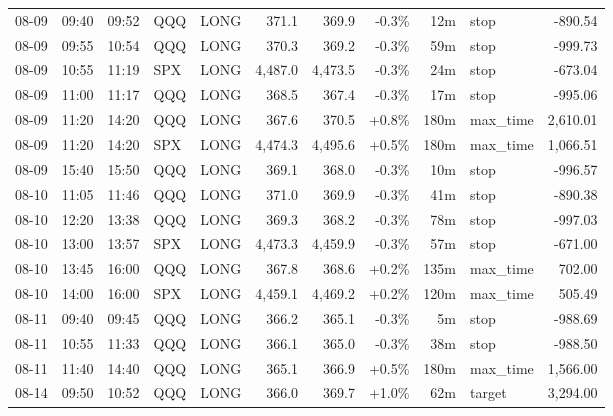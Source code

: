 \documentclass[11pt,a4paper,twoside]{article}
\begin{document}
\begin{center}
\begin{longtable}{>{\color{txtmain}}l l l l l r r r r >{\color{txtmain}}l r}
08-09 & 09:40 & 09:52 & QQQ & LONG & 371.1 & 369.9 & \textcolor{lossred}{-0.3\%} & 12m & stop & \textcolor{lossred}{-890.54} \\
08-09 & 09:55 & 10:54 & QQQ & LONG & 370.3 & 369.2 & \textcolor{lossred}{-0.3\%} & 59m & stop & \textcolor{lossred}{-999.73} \\
08-09 & 10:55 & 11:19 & SPX & LONG & 4,487.0 & 4,473.5 & \textcolor{lossred}{-0.3\%} & 24m & stop & \textcolor{lossred}{-673.04} \\
08-09 & 11:00 & 11:17 & QQQ & LONG & 368.5 & 367.4 & \textcolor{lossred}{-0.3\%} & 17m & stop & \textcolor{lossred}{-995.06} \\
08-09 & 11:20 & 14:20 & QQQ & LONG & 367.6 & 370.5 & \textcolor{wingreen}{+0.8\%} & 180m & max\_time & \textcolor{wingreen}{2,610.01} \\
08-09 & 11:20 & 14:20 & SPX & LONG & 4,474.3 & 4,495.6 & \textcolor{wingreen}{+0.5\%} & 180m & max\_time & \textcolor{wingreen}{1,066.51} \\
08-09 & 15:40 & 15:50 & QQQ & LONG & 369.1 & 368.0 & \textcolor{lossred}{-0.3\%} & 10m & stop & \textcolor{lossred}{-996.57} \\
08-10 & 11:05 & 11:46 & QQQ & LONG & 371.0 & 369.9 & \textcolor{lossred}{-0.3\%} & 41m & stop & \textcolor{lossred}{-890.38} \\
08-10 & 12:20 & 13:38 & QQQ & LONG & 369.3 & 368.2 & \textcolor{lossred}{-0.3\%} & 78m & stop & \textcolor{lossred}{-997.03} \\
08-10 & 13:00 & 13:57 & SPX & LONG & 4,473.3 & 4,459.9 & \textcolor{lossred}{-0.3\%} & 57m & stop & \textcolor{lossred}{-671.00} \\
08-10 & 13:45 & 16:00 & QQQ & LONG & 367.8 & 368.6 & \textcolor{wingreen}{+0.2\%} & 135m & max\_time & \textcolor{wingreen}{702.00} \\
08-10 & 14:00 & 16:00 & SPX & LONG & 4,459.1 & 4,469.2 & \textcolor{wingreen}{+0.2\%} & 120m & max\_time & \textcolor{wingreen}{505.49} \\
08-11 & 09:40 & 09:45 & QQQ & LONG & 366.2 & 365.1 & \textcolor{lossred}{-0.3\%} & 5m & stop & \textcolor{lossred}{-988.69} \\
08-11 & 10:55 & 11:33 & QQQ & LONG & 366.1 & 365.0 & \textcolor{lossred}{-0.3\%} & 38m & stop & \textcolor{lossred}{-988.50} \\
08-11 & 11:40 & 14:40 & QQQ & LONG & 365.1 & 366.9 & \textcolor{wingreen}{+0.5\%} & 180m & max\_time & \textcolor{wingreen}{1,566.00} \\
08-14 & 09:50 & 10:52 & QQQ & LONG & 366.0 & 369.7 & \textcolor{wingreen}{+1.0\%} & 62m & target & \textcolor{wingreen}{3,294.00} \\

\end{longtable}
\end{center}
\end{document}
